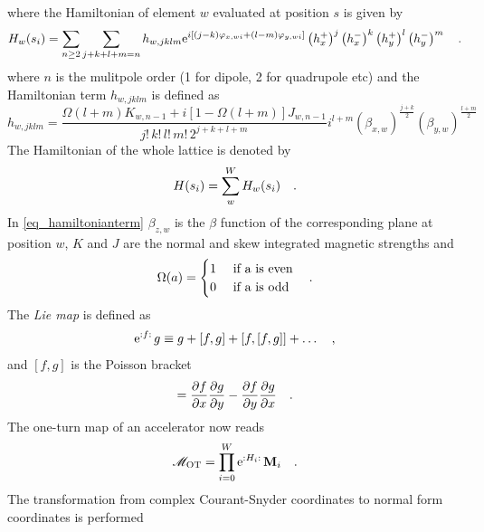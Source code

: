 where the Hamiltonian of element $w$ evaluated at position $s$ is given by
%
\begin{equation}
    H_w(s_i) = \sum\limits_{n\geq2} \sum\limits_{j+k+l+m=n} h_{w,jklm}
    \text{e}^{i \left[
        (j-k) \varphi_{x,wi} + (l-m) \varphi_{y,wi}
    \right]}
    \left(h_x^+\right)^j
    \left(h_x^-\right)^k
    \left(h_y^+\right)^l
    \left(h_y^-\right)^m
    \quad .
\end{equation}
%
where $n$ is the mulitpole order (1 for dipole, 2 for quadrupole etc)
and the Hamiltonian term $h_{w,jklm}$ is defined as
%
\begin{equation}
    h_{w,jklm} = 
    \frac{
        \Omega(l+m) K_{w,n-1} + i\left[1-\Omega(l+m)\right] J_{w,n-1}
    }{
        j!\,k!\,l!\,m!\,2^{j+k+l+m}
    }
    i^{l+m}
    (\beta_{x,w})^{\frac{j+k}{2}}
    (\beta_{y,w})^{\frac{l+m}{2}}
    \label{eq_hamiltonianterm}
\end{equation}
%
The Hamiltonian of the whole lattice is denoted by
%
\begin{equation}
    H(s_i) = \sum\limits_w^W H_w(s_i)
    \quad .
\end{equation}
%
In \eqref{eq_hamiltonianterm} $\beta_{z,w}$ is the $\beta$ function of the corresponding plane at position $w$,
$K$ and $J$ are the normal and skew integrated magnetic strengths and 
%
\begin{equation}
    \Omega(a) = 
    \begin{cases}
        1 &\text{ if a is even} \\
        0 &\text{ if a is odd} \\
    \end{cases}
    \quad .
\end{equation}
%
The \emph{Lie map} is defined as
%
\begin{equation}
    \text{e}^{{:}f{:}\,}g \equiv g + [f,g] + [f, [f,g]] + \ldots
    \quad ,
    \label{eq_liemap}
\end{equation}
%
and $[f,g]$ is the Poisson bracket
%
\begin{equation}
    [f,g] = 
    \frac{\partial f}{\partial x} \frac{\partial g}{\partial y}
    - \frac{\partial f}{\partial y}\frac{\partial g}{\partial x}
    \fstop
\end{equation}
%
The one-turn map of an accelerator now reads
%
\begin{equation}
    \mathscr{M}_\text{OT} = \prod\limits_{i=0}^W \text{e}^{{:}H_i{:}\,} \mathbf{M}_i
    \quad .
\end{equation}
%
The transformation from complex Courant-Snyder coordinates to normal form coordinates is performed
